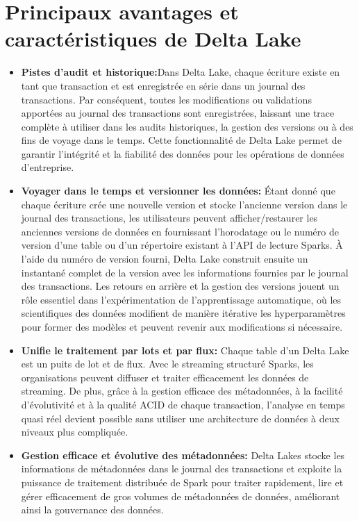 \section{Principaux avantages et caractéristiques de Delta Lake}
\begin{itemize}
	\item[\textbullet] \textbf{Pistes d'audit et historique:}Dans Delta Lake, chaque écriture existe en tant que transaction et est enregistrée en série dans un journal des transactions. Par conséquent, toutes les modifications ou validations apportées au journal des transactions sont enregistrées, laissant une trace complète à utiliser dans les audits historiques, la gestion des versions ou à des fins de voyage dans le temps. Cette fonctionnalité de Delta Lake permet de garantir l'intégrité et la fiabilité des données pour les opérations de données d'entreprise.
	\item[\textbullet] \textbf{Voyager dans le temps et versionner les données:} Étant donné que chaque écriture crée une nouvelle version et stocke l'ancienne version dans le journal des transactions, les utilisateurs peuvent afficher/restaurer les anciennes versions de données en fournissant l'horodatage ou le numéro de version d'une table ou d'un répertoire existant à l'API de lecture Sparks\@. À l'aide du numéro de version fourni, Delta Lake construit ensuite un instantané complet de la version avec les informations fournies par le journal des transactions. Les retours en arrière et la gestion des versions jouent un rôle essentiel dans l'expérimentation de l'apprentissage automatique, où les scientifiques des données modifient de manière itérative les hyperparamètres pour former des modèles et peuvent revenir aux modifications si nécessaire.
	\item[\textbullet] \textbf{Unifie le traitement par lots et par flux:} Chaque table d'un Delta Lake est un puits de lot et de flux. Avec le streaming structuré Sparks, les organisations peuvent diffuser et traiter efficacement les données de streaming. De plus, grâce à la gestion efficace des métadonnées, à la facilité d'évolutivité et à la qualité ACID de chaque transaction, l'analyse en temps quasi réel devient possible sans utiliser une architecture de données à deux niveaux plus compliquée.
	\item[\textbullet] \textbf{Gestion efficace et évolutive des métadonnées:} Delta Lakes stocke les informations de métadonnées dans le journal des transactions et exploite la puissance de traitement distribuée de Spark pour traiter rapidement, lire et gérer efficacement de gros volumes de métadonnées de données, améliorant ainsi la gouvernance des données.

\end{itemize}
